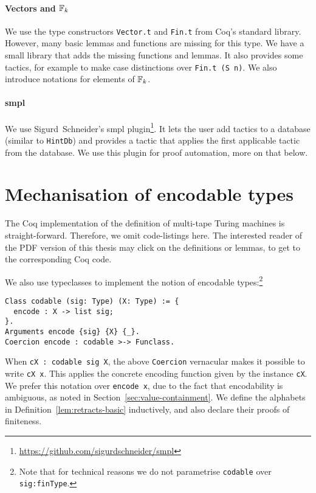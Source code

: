 \paragraph{Vectors and $\mathbb{F}_k$}

We use the type constructors \lstinline!Vector.t! and \lstinline!Fin.t! from Coq's standard library.  However, many basic lemmas and functions are
missing for this type.  We have a small library that adds the missing functions and lemmas.  It also provides some tactics, for example to make case
distinctions over \lstinline!Fin.t (S n)!.  We also introduce notations for elements of $\mathbb{F}_k$.

\paragraph{smpl}

We use Sigurd~Schneider's smpl plugin\footnote{\url{https://github.com/sigurdschneider/smpl}}.  It lets the user add tactics to a database (similar to
\lstinline!HintDb!) and provides a tactic that applies the first applicable tactic from the database.  We use this plugin for proof automation, more
on that below.


\section*{Mechanisation of encodable types}
\label{sec:coq-values}

The Coq implementation of the definition of multi-tape Turing machines is straight-forward.  Therefore, we omit code-listings here.  The interested
reader of the PDF version of this thesis may click on the definitions or lemmas, to get to the corresponding Coq code.

We also use typeclasses to implement the notion of encodable types:\footnote{Note that for technical reasons we do not parametrise \lstinline!codable!
  over \lstinline!sig:finType!.}

\begin{lstlisting}
Class codable (sig: Type) (X: Type) := {
  encode : X -> list sig;
}.
Arguments encode {sig} {X} {_}.
Coercion encode : codable >-> Funclass.
\end{lstlisting}

When \lstinline!cX : codable sig X!, the above \lstinline!Coercion! vernacular makes it possible to write \lstinline!cX x!.  This applies the concrete
encoding function given by the instance \lstinline!cX!.  We prefer this notation over \lstinline!encode x!, due to the fact that encodability is
ambiguous, as noted in Section~\ref{sec:value-containment}.  We define the alphabets in Definition~\ref{lem:retracts-basic} inductively, and also
declare their proofs of finiteness.

